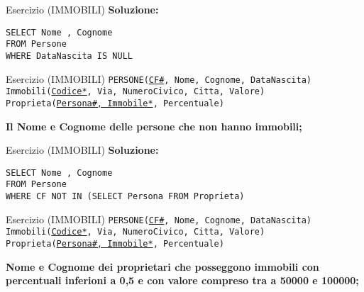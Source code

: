 \begin{frame}{Esercizio (IMMOBILI)}
    \textbf{Soluzione:}
    \vspace{1em}
    
    \texttt{SELECT Nome , Cognome\\FROM Persone\\WHERE DataNascita IS NULL}
    \end{frame}
\begin{frame}{Esercizio (IMMOBILI) } 
    \texttt{PERSONE(\underline{CF\#}, Nome, Cognome, DataNascita)\\
    Immobili(\underline{Codice*}, Via, NumeroCivico, Citta, Valore)\\
    Proprieta(\underline{Persona\#, Immobile*}, Percentuale)}
    \vspace{1em}
    
    \textbf{Il Nome e Cognome delle persone che non hanno immobili;}
\end{frame}

\begin{frame}{Esercizio (IMMOBILI)}
    \textbf{Soluzione:}
    \vspace{1em}
    
    \texttt{SELECT Nome , Cognome\\FROM Persone\\WHERE CF NOT IN (SELECT Persona FROM Proprieta)}
\end{frame}
\begin{frame}{Esercizio (IMMOBILI) } 
    \texttt{PERSONE(\underline{CF\#}, Nome, Cognome, DataNascita)\\
    Immobili(\underline{Codice*}, Via, NumeroCivico, Citta, Valore)\\
    Proprieta(\underline{Persona\#, Immobile*}, Percentuale)}
    \vspace{1em}
    
    \textbf{Nome e Cognome dei proprietari che posseggono immobili con percentuali inferioni a 0,5 e con valore compreso tra a 50000 e 100000;}
\end{frame}

